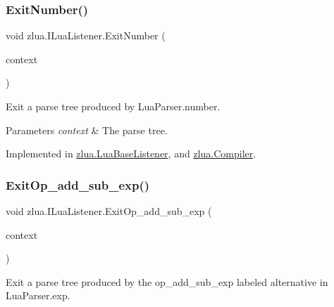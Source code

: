 \subsubsection{\texorpdfstring{Exit\+Number()}{ExitNumber()}}
{\footnotesize\ttfamily void zlua.\+I\+Lua\+Listener.\+Exit\+Number (\begin{DoxyParamCaption}\item[{\mbox{[}\+Not\+Null\mbox{]} \mbox{\hyperlink{classzlua_1_1_lua_parser_1_1_number_context}{Lua\+Parser.\+Number\+Context}}}]{context }\end{DoxyParamCaption})}



Exit a parse tree produced by Lua\+Parser.\+number. 


\begin{DoxyParams}{Parameters}
{\em context} & The parse tree.\\
\hline
\end{DoxyParams}


Implemented in \mbox{\hyperlink{classzlua_1_1_lua_base_listener_a64548a4ec69a61b39e8a7c6d2f022e83}{zlua.\+Lua\+Base\+Listener}}, and \mbox{\hyperlink{classzlua_1_1_compiler_a89a20cafde0ae8bc4079c91635b47c5f}{zlua.\+Compiler}}.

\mbox{\label{interfacezlua_1_1_i_lua_listener_a51e9a33e0c604e3a6151becd926a5852}} 
\subsubsection{\texorpdfstring{Exit\+Op\+\_\+add\+\_\+sub\+\_\+exp()}{ExitOp\_add\_sub\_exp()}}
{\footnotesize\ttfamily void zlua.\+I\+Lua\+Listener.\+Exit\+Op\+\_\+add\+\_\+sub\+\_\+exp (\begin{DoxyParamCaption}\item[{\mbox{[}\+Not\+Null\mbox{]} \mbox{\hyperlink{classzlua_1_1_lua_parser_1_1_op__add__sub__exp_context}{Lua\+Parser.\+Op\+\_\+add\+\_\+sub\+\_\+exp\+Context}}}]{context }\end{DoxyParamCaption})}



Exit a parse tree produced by the {\ttfamily op\+\_\+add\+\_\+sub\+\_\+exp} labeled alternative in Lua\+Parser.\+exp. 


